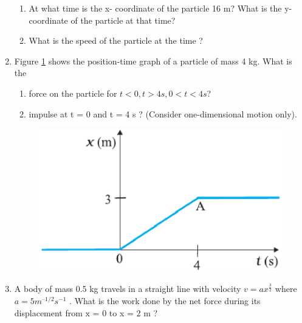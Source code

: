 \begin{enumerate}[label=\arabic*.,ref=\thesubsection.\theenumi]
\begin{enumerate}
\item  At what time is
the x- coordinate of the particle 16 m? What is the y-coordinate of the particle at that time? 
\item  What is the speed of the particle at the time ?
\end{enumerate}
\item Figure \ref{fig:5.16} shows the position-time graph of a particle of mass 4 kg. What is the 
\begin{enumerate}
\item  force on the particle for $t < 0, t > 4 s, 0 < t < 4 s$? 
\item  impulse at t = 0 and t = 4 s ? (Consider one-dimensional motion only).
\end{enumerate}
\begin{figure}[!ht]
\centering
\includegraphics[width=\columnwidth]{./figs/11-1/5/5.16.eps}
\caption{}
\label{fig:5.16}
\end{figure}
\item  A body of mass 0.5 kg travels in a straight line with velocity $v =a x^{\frac{3}{2}}$ where $a = 5 m^{–1/2}s^{-1}$ .
What is the work done by the net force during its displacement from x = 0 to x = 2 m ?
\end{enumerate}
